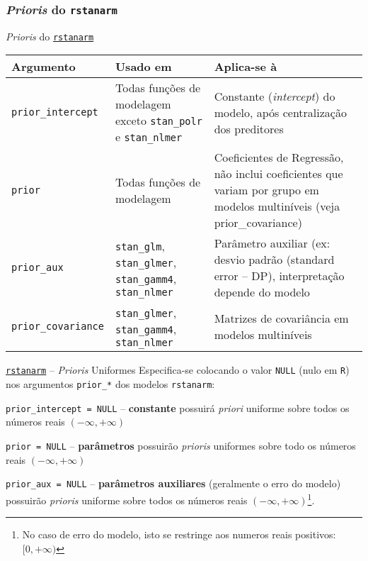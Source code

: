 \subsubsection{\textit{Prioris} do \texttt{rstanarm}}
\begin{frame}{\textit{Prioris} do \href{http://mc-stan.org/rstanarm/}{\texttt{rstanarm}}}
	\footnotesize
	\begin{tabular}{|l|p{}|p{}|}
		\toprule
		\textbf{Argumento}         & \textbf{Usado em}                                                                    & \textbf{Aplica-se à}                                                                                                    \\ \midrule
		\texttt{prior\_intercept}  & Todas funções de modelagem exceto \texttt{stan\_polr} e \texttt{stan\_nlmer}         & Constante (\textit{intercept}) do modelo, após centralização dos preditores                                             \\ \midrule
		\texttt{prior}             & Todas funções de modelagem                                                           & Coeficientes de Regressão, não inclui coeficientes que variam por grupo em modelos multiníveis (veja prior\_covariance) \\ \midrule
		\texttt{prior\_aux}        & \texttt{stan\_glm}, \texttt{stan\_glmer}, \texttt{stan\_gamm4}, \texttt{stan\_nlmer} & Parâmetro auxiliar (ex: desvio padrão (standard error – DP), interpretação depende do modelo                            \\ \midrule
		\texttt{prior\_covariance} & \texttt{stan\_glmer}, \texttt{stan\_gamm4}, \texttt{stan\_nlmer}                     & Matrizes de covariância em modelos multiníveis                                                                          \\
		\bottomrule
	\end{tabular}
\end{frame}

\begin{frame}{\href{http://mc-stan.org/rstanarm/}{\texttt{rstanarm}} -- \textit{Prioris} Uniformes}
	Especifica-se colocando o valor \texttt{NULL} (nulo em \texttt{R}) nos argumentos
	\texttt{prior\_*} dos modelos \texttt{rstanarm}:
	\begin{vfilleditems}
		\item \lstinline!prior_intercept = NULL! -- \textbf{constante} possuirá \textit{priori} uniforme sobre todos os números reais $(-\infty, +\infty)$
		\item \lstinline!prior = NULL! -- \textbf{parâmetros} possuirão \textit{prioris} uniformes sobre todo os números reais $(-\infty, +\infty)$
		\item \lstinline!prior_aux = NULL! -- \textbf{parâmetros auxiliares} (geralmente o erro do modelo) possuirão \textit{prioris} uniforme sobre todos os números reais $(-\infty, +\infty)$\footnote{No caso de erro do modelo, isto se restringe aos numeros reais positivos: $[0, +\infty)$}.
	\end{vfilleditems}
\end{frame}

